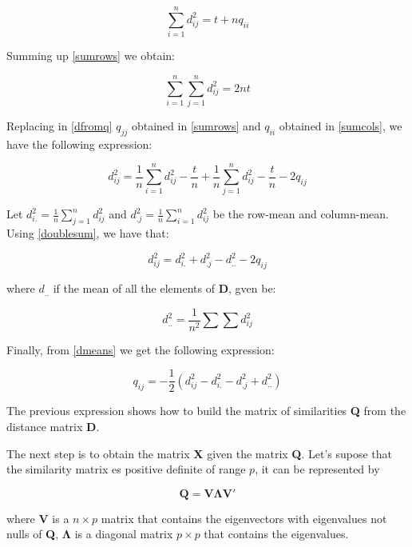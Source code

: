 \documentclass[11pt]{report}
\begin{document}
\begin{equation} \label{sumcols}
\sum_{i = 1}^n d_{ij}^2 = t + nq_{ii}
\end{equation}

\indent Summing up \ref{sumrows} we obtain:

\begin{equation} \label{doublesum}
\sum_{i = 1}^n\sum_{j = 1}^n d_{ij}^2 = 2nt
\end{equation}

\indent Replacing in \ref{dfromq} $q_{jj}$ obtained in \ref{sumrows} and $q_{ii}$
obtained in \ref{sumcols}, we have the following expression:

\begin{equation} \label{generaldij}
d_{ij}^2 = \frac{1}{n}\sum_{i = 1}^n d_{ij}^2 - \frac{t}{n} + \frac{1}{n} \sum_{j = 1}^n d_{ij}^2 -\frac{t}{n} -2q_{ij}
\end{equation}

\indent Let $d_{i.}^2 = \frac{1}{n}\sum_{j = 1}^n d_{ij}^2$ and $d_{.j}^2 = \frac{1}{n}\sum_{i=1}^n d_{ij}^2$ 
be the row-mean and column-mean. Using \ref{doublesum}, we have that:

\begin{equation} \label{dmeans}
d_{ij}^2 = d_{i.}^2 + d_{.j}^2 - d_{..}^2-2q_{ij}
\end{equation}

where $d_{..}$ if the mean of all the elements of \textbf{D}, gven be:

$$d_{..}^2 = \frac{1}{n^2}\sum \sum d_{ij}^2$$

\indent Finally, from \ref{dmeans} we get the following expression:

\begin{equation} \label{qij2}
q_{ij} = -\frac{1}{2}(d_{ij}^2 - d_{i.}^2 - d_{.j}^2 + d_{..}^2)
\end{equation}

\indent The previous expression shows how to build the matrix of similarities \textbf{Q}
from the distance matrix \textbf{D}.

\indent The next step is to obtain the matrix \textbf{X} given the matrix \textbf{Q}.
Let's supose that the similarity matrix es positive definite of range $p$, it can
be represented by 

$$\mathbf{Q} = \mathbf{V}\mathbf{\Lambda}\mathbf{V'}$$

where $\mathbf{V}$ is a $n \times p$ matrix that contains the eigenvectors with
eigenvalues not nulls of \textbf{Q}, $\mathbf{\Lambda}$ is a diagonal matrix 
$p \times p$ that contains the eigenvalues.
\end{document}
